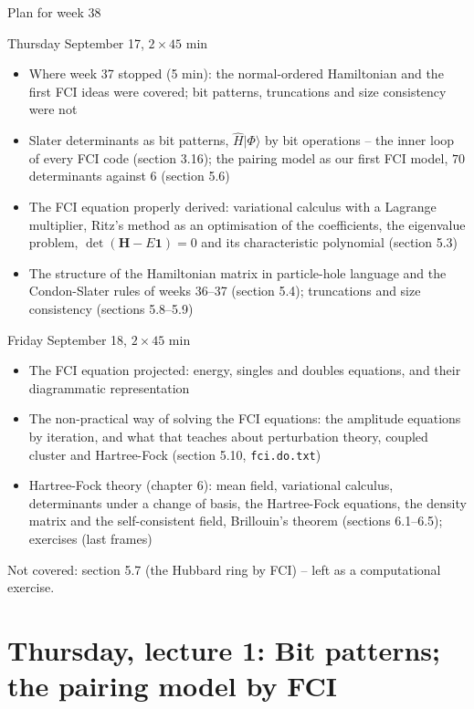 \documentclass[aspectratio=169,10pt]{beamer}
\newcommand{\ket}[1]{\vert #1\rangle}
\begin{document}
\begin{frame}{Plan for week 38}
  \scriptsize
  \begin{block}{Thursday September 17, $2\times45$ min}
    \begin{itemize}
      \item Where week 37 stopped (5 min): the normal-ordered Hamiltonian and the first FCI ideas were covered; bit patterns, truncations and size consistency were not
      \item Slater determinants as bit patterns, $\hat{H}\ket{\Phi}$ by bit operations -- the inner loop of every FCI code (section 3.16); the pairing model as our first FCI model, $70$ determinants against $6$ (section 5.6)
      \item The FCI equation properly derived: variational calculus with a Lagrange multiplier, Ritz's method as an optimisation of the coefficients, the eigenvalue problem, $\det(\bm{H}-E\bm{1})=0$ and its characteristic polynomial (section 5.3)
      \item The structure of the Hamiltonian matrix in particle-hole language and the Condon-Slater rules of weeks 36--37 (section 5.4); truncations and size consistency (sections 5.8--5.9)
    \end{itemize}
  \end{block}
  \begin{block}{Friday September 18, $2\times45$ min}
    \begin{itemize}
      \item The FCI equation projected: energy, singles and doubles equations, and their diagrammatic representation
      \item The non-practical way of solving the FCI equations: the amplitude equations by iteration, and what that teaches about perturbation theory, coupled cluster and Hartree-Fock (section 5.10, \texttt{fci.do.txt})
      \item Hartree-Fock theory (chapter 6): mean field, variational calculus, determinants under a change of basis, the Hartree-Fock equations, the density matrix and the self-consistent field, Brillouin's theorem (sections 6.1--6.5); exercises (last frames)
    \end{itemize}
  \end{block}
  Not covered: section 5.7 (the Hubbard ring by FCI) -- left as a computational exercise.
\end{frame}

\section{Thursday, lecture 1: Bit patterns; the pairing model by FCI}
\end{document}
